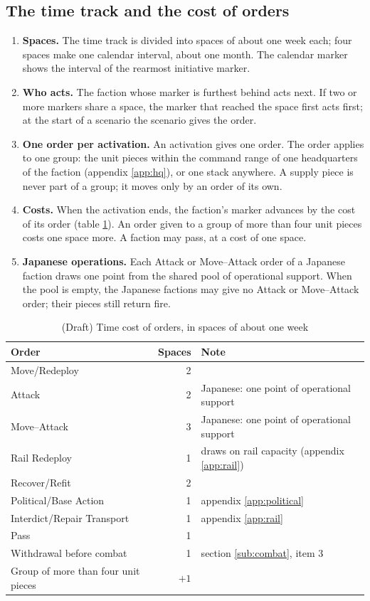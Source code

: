 \documentclass[11pt]{article}
\begin{document}
\subsection{The time track and the cost of orders}\label{app:orders}
\draft
\begin{enumerate}
\item \textbf{Spaces.} The time track is divided into spaces of about one week each; four spaces make one calendar interval, about one month. The calendar marker shows the interval of the rearmost initiative marker.
\item \textbf{Who acts.} The faction whose marker is furthest behind acts next. If two or more markers share a space, the marker that reached the space first acts first; at the start of a scenario the scenario gives the order.
\item \textbf{One order per activation.} An activation gives one order. The order applies to one group: the unit pieces within the command range of one headquarters of the faction (appendix \ref{app:hq}), or one stack anywhere. A supply piece is never part of a group; it moves only by an order of its own.
\item \textbf{Costs.} When the activation ends, the faction's marker advances by the cost of its order (table \ref{tab:ordercost}). An order given to a group of more than four unit pieces costs one space more. A faction may pass, at a cost of one space.
\item \textbf{Japanese operations.} Each Attack or Move--Attack order of a Japanese faction draws one point from the shared pool of operational support. When the pool is empty, the Japanese factions may give no Attack or Move--Attack order; their pieces still return fire.
\end{enumerate}

\begin{table}[ht]
\centering\small
\begin{tabular}{@{}lrl@{}}
\toprule
Order & Spaces & Note \\
\midrule
Move/Redeploy & 2 & \\
Attack & 2 & Japanese: one point of operational support \\
Move--Attack & 3 & Japanese: one point of operational support \\
Rail Redeploy & 1 & draws on rail capacity (appendix \ref{app:rail}) \\
Recover/Refit & 2 & \\
Political/Base Action & 1 & appendix \ref{app:political} \\
Interdict/Repair Transport & 1 & appendix \ref{app:rail} \\
Pass & 1 & \\
Withdrawal before combat & 1 & section \ref{sub:combat}, item 3 \\
Group of more than four unit pieces & $+1$ & \\
\bottomrule
\end{tabular}
\caption{(Draft) Time cost of orders, in spaces of about one week}\label{tab:ordercost}
\end{table}
\end{document}
